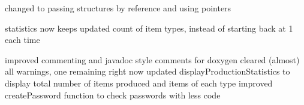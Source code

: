 changed to passing structures by reference and using pointers

statistics now keeps updated count of item types, instead of starting back at 1 each time

improved commenting and javadoc style comments for doxygen cleared (almost) all warnings, one remaining right now updated display\+Production\+Statistics to display total number of items produced and items of each type improved create\+Password function to check passwords with less code 